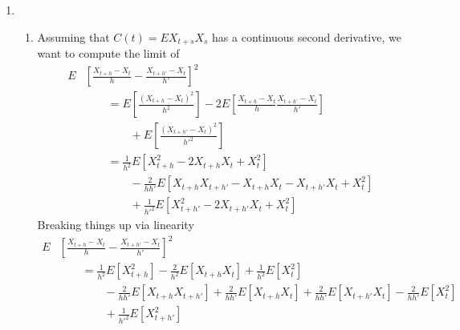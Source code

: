 \documentclass[12pt]{article}
\theoremstyle{plain}
\theoremstyle{definition}
\theoremstyle{remark}
\begin{document}
\begin{enumerate}
\begin{enumerate}

    \end{enumerate}

  \item %
    \begin{enumerate}
      \item Assuming that $C(t) = EX_{t+s}X_s$ has a continuous second
      derivative, we want to compute the limit of
      \begin{align*}
        E&\left[\frac{X_{t+h}-X_t}{h} - \frac{X_{t+h'}-X_t}{h'}\right]^2 \\
        &\qquad
          = E\left[\frac{\left(X_{t+h}-X_t\right)^2}{h^2}\right]
            - 2E\left[ \frac{X_{t+h}-X_t}{h} \frac{X_{t+h'}-X_t}{h'}\right]\\
          &\qquad\qquad + E\left[\frac{\left(X_{t+h'}-X_t\right)^2}{h'^2}\right]\\
        &\qquad
          =
            \frac{1}{h^2}E\left[X^2_{t+h}-2X_{t+h}X_t+X_t^2\right]\\
          & \qquad\qquad- \frac{2}{hh'}
            E\left[ X_{t+h}X_{t+h'} -X_{t+h} X_t -X_{t+h'}X_t + X_t^2\right]\\
          &\qquad\qquad + \frac{1}{h'^2} E\left[X_{t+h'}^2 - 2X_{t+h'}X_t + X_t^2\right]
      \end{align*}
    Breaking things up via linearity
    \begin{align*}
      E&\left[\frac{X_{t+h}-X_t}{h} - \frac{X_{t+h'}-X_t}{h'}\right]^2 \\
        &\qquad=
          \frac{1}{h^2}E\left[X^2_{t+h}\right]
          -\frac{2}{h^2}E\left[X_{t+h}X_t\right]
          +\frac{1}{h^2}E\left[X_t^2\right]\\
        & \qquad\qquad
          -\frac{2}{hh'}
          E\left[ X_{t+h}X_{t+h'}\right]
          +\frac{2}{hh'}
          E\left[ X_{t+h} X_t\right]
          +\frac{2}{hh'}
          E\left[ X_{t+h'}X_t \right]
          -\frac{2}{hh'}
          E\left[ X_t^2\right]\\
        &\qquad\qquad
          + \frac{1}{h'^2} E\left[X_{t+h'}^2\right]

\end{align*}
\end{enumerate}
\end{enumerate}
\end{document}
